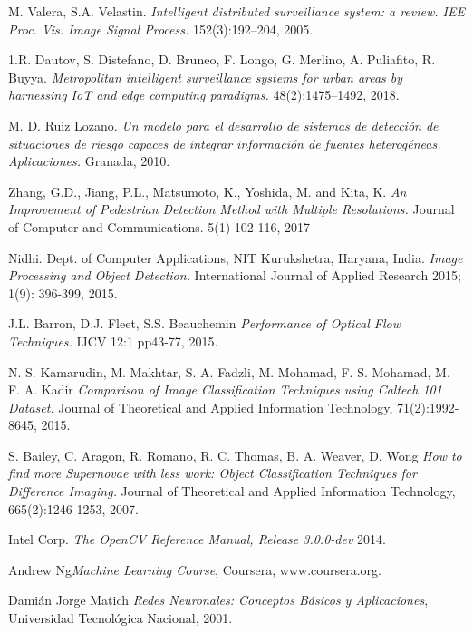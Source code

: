 \documentclass[a4paper,12pt,oneside,spanish]{book}
\begin{document}
\newpage	
\begin{thebibliography}{9}
	M. Valera, S.A. Velastin. \textit{Intelligent distributed surveillance system: a review. IEE Proc. Vis. Image Signal Process.} 152(3):192–204, 2005.
	
	1.R. Dautov, S. Distefano, D. Bruneo, F. Longo, G. Merlino, A. Puliafito, R. Buyya. \textit{Metropolitan intelligent surveillance systems for urban areas by harnessing IoT and edge computing paradigms.} 48(2):1475–1492, 2018.

	M. D. Ruiz Lozano. \textit{Un modelo para el desarrollo de sistemas de detección de situaciones de riesgo capaces de integrar información de fuentes heterogéneas. Aplicaciones.} Granada, 2010.

	Zhang, G.D., Jiang, P.L., Matsumoto, K., Yoshida, M. and Kita, K. \textit{An Improvement of Pedestrian Detection Method with Multiple Resolutions.} Journal of Computer and Communications. 5(1) 102-116, 2017

	Nidhi. Dept. of Computer Applications, NIT Kurukshetra, Haryana, India. \textit{Image Processing and Object Detection.} International Journal of Applied Research 2015; 1(9): 396-399, 2015.
	
	J.L. Barron, D.J. Fleet, S.S. Beauchemin \textit{Performance of Optical Flow Techniques.} IJCV 12:1 pp43-77, 2015.
	
	N. S. Kamarudin, M. Makhtar, S. A. Fadzli, M. Mohamad, F. S. Mohamad, M. F. A. 
	Kadir \textit{Comparison of Image Classification Techniques using Caltech 101 Dataset.} Journal of Theoretical and Applied Information Technology, 71(2):1992-8645, 2015.
	
	S. Bailey, C. Aragon, R. Romano, R. C. Thomas, B. A. Weaver, D. Wong \textit{How to find more Supernovae with less work: Object Classification Techniques for Difference Imaging.} Journal of Theoretical and Applied Information Technology, 665(2):1246-1253, 2007.	
	
	Intel Corp. \textit{The OpenCV Reference Manual, Release 3.0.0-dev} 2014.	
			
	Andrew Ng\textit{Machine Learning Course}, Coursera, www.coursera.org.	
	
	Damián Jorge Matich \textit{Redes Neuronales: Conceptos Básicos y Aplicaciones}, Universidad Tecnológica Nacional, 2001.	
	

\end{thebibliography}
\end{document}
